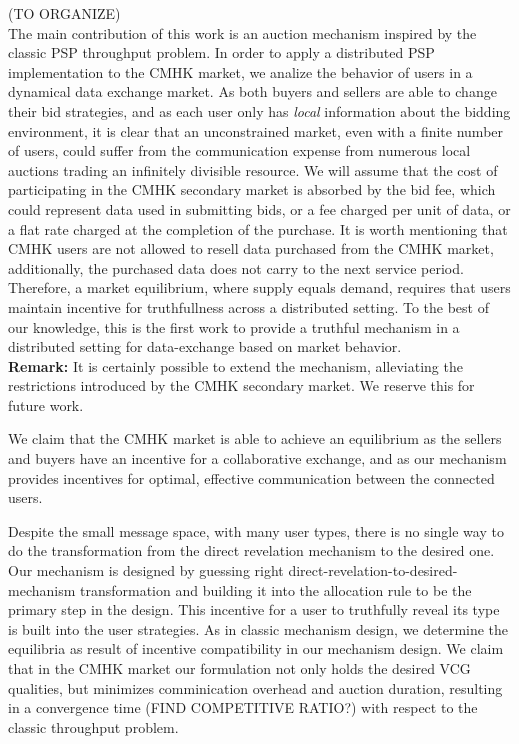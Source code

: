 \documentclass[sigconf, anonymous]{acmart}
\theoremstyle{definition}
\begin{document}
(TO ORGANIZE)\\
The main contribution of this work 
is an auction mechanism inspired by the classic PSP throughput problem. In
order to apply a distributed PSP implementation to the CMHK market,
we analize the behavior of users in a dynamical data exchange market. As both buyers and sellers are able
to change their bid strategies, and as each user only has \emph{local}
information about the bidding environment, it is clear that an unconstrained
market, even with a finite number of users, could suffer from the communication
expense from numerous local auctions trading an infinitely divisible resource.
We will assume that the cost of participating in the CMHK secondary market is
absorbed by the bid fee, which could represent data used in submitting bids, or
a fee charged per unit of data, or a flat rate charged at the completion of the
purchase. It is worth mentioning that CMHK users are not allowed to resell data
purchased from the CMHK
market, additionally, the purchased data does not carry to the next
service period. Therefore, a market equilibrium, where
supply equals demand, requires that users maintain incentive for truthfullness
across a distributed setting.
To the best of our knowledge, this is the first work to provide a truthful
mechanism in a distributed setting for data-exchange based on market behavior.
\\
\textbf{Remark:} It is certainly possible to extend the mechanism, alleviating the
restrictions introduced by the CMHK secondary market. We reserve this for
future work.

We claim that the CMHK market is
able to achieve an equilibrium as the sellers and buyers have an
incentive for a collaborative exchange, and as our mechanism provides incentives
for optimal, effective communication between the connected users. 

Despite the small message space, with many user types, there is no single
way to do the transformation from the direct revelation mechanism to the
desired one. Our mechanism is designed by guessing
right direct-revelation-to-desired-mechanism transformation and building it
into the allocation rule to be the primary step in the design. This incentive for a user to
truthfully reveal its type is built into the user strategies. As in classic
mechanism design, we determine the equilibria as result of incentive
compatibility in our mechanism design. 
We claim that in the CMHK market our formulation not only holds the desired VCG qualities,
but minimizes comminication overhead 
and auction duration, resulting in a convergence time (FIND COMPETITIVE RATIO?)
with respect to the classic throughput problem. 
\end{document}
